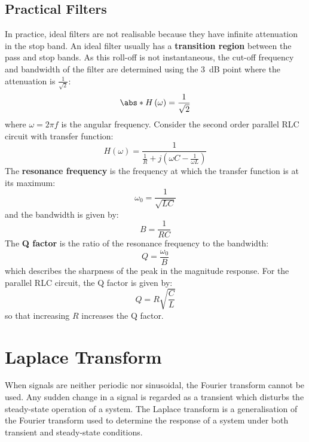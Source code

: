\documentclass{article}
\begin{document}
\subsection{Practical Filters}
In practice, ideal filters are not realisable because they have
infinite attenuation in the stop band. An ideal filter usually has a
\textbf{transition region} between the pass and stop bands. As this
roll-off is not instantaneous, the cut-off frequency and bandwidth of
the filter are determined using the \qty{3}{dB} point where the
attenuation is \(\frac{1}{\sqrt{2}}\):
\begin{equation*}
    \abs*{H\left( \omega \right)} = \frac{1}{\sqrt{2}}
\end{equation*}
where \(\omega = 2\pi f\) is the angular frequency.
Consider the second order parallel RLC circuit with transfer function:
\begin{equation*}
    H\left( \omega \right) = \frac{1}{\frac{1}{R} + j \left( \omega C - \frac{1}{\omega L} \right)}
\end{equation*}
The \textbf{resonance frequency} is the frequency at which the transfer
function is at its maximum:
\begin{equation*}
    \omega_0 = \frac{1}{\sqrt{LC}}
\end{equation*}
and the bandwidth is given by:
\begin{equation*}
    B = \frac{1}{RC}
\end{equation*}
The \textbf{Q factor} is the ratio of the resonance frequency to the bandwidth:
\begin{equation*}
    Q = \frac{\omega_0}{B}
\end{equation*}
which describes the sharpness of the peak in the magnitude response.
For the parallel RLC circuit, the Q factor is given by:
\begin{equation*}
    Q = R \sqrt{\frac{C}{L}}
\end{equation*}
so that increasing \(R\) increases the Q factor.
\section{Laplace Transform}
When signals are neither periodic nor sinusoidal, the Fourier transform
cannot be used. Any sudden change in a signal is regarded as a
transient which disturbs the steady-state operation of a system. The
Laplace transform is a generalisation of the Fourier transform used to
determine the response of a system under both transient and
steady-state conditions.
\end{document}
